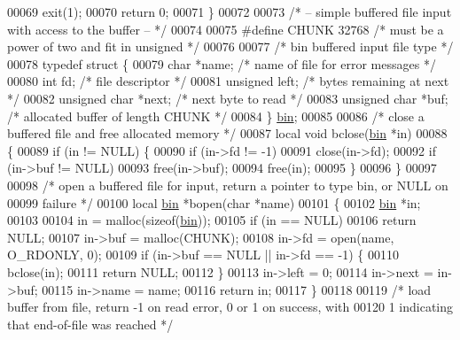 \begin{DoxyCode}
{00069     exit(1);
00070     \textcolor{keywordflow}{return} 0;
00071 \}
00072 
00073 \textcolor{comment}{/* -- simple buffered file input with access to the buffer -- */}
00074 
00075 \textcolor{preprocessor}{#define CHUNK 32768         }\textcolor{comment}{/* must be a power of two and fit in unsigned */}\textcolor{preprocessor}{}
00076 
00077 \textcolor{comment}{/* bin buffered input file type */}
00078 \textcolor{keyword}{typedef} \textcolor{keyword}{struct }\{
00079     \textcolor{keywordtype}{char} *name;             \textcolor{comment}{/* name of file for error messages */}
00080     \textcolor{keywordtype}{int} fd;                 \textcolor{comment}{/* file descriptor */}
00081     \textcolor{keywordtype}{unsigned} left;          \textcolor{comment}{/* bytes remaining at next */}
00082     \textcolor{keywordtype}{unsigned} \textcolor{keywordtype}{char} *next;    \textcolor{comment}{/* next byte to read */}
00083     \textcolor{keywordtype}{unsigned} \textcolor{keywordtype}{char} *buf;     \textcolor{comment}{/* allocated buffer of length CHUNK */}
00084 \} \hyperlink{structbin}{bin};
00085 
00086 \textcolor{comment}{/* close a buffered file and free allocated memory */}
00087 local \textcolor{keywordtype}{void} bclose(\hyperlink{structbin}{bin} *in)
00088 \{
00089     \textcolor{keywordflow}{if} (in != NULL) \{
00090         \textcolor{keywordflow}{if} (in->fd != -1)
00091             close(in->fd);
00092         \textcolor{keywordflow}{if} (in->buf != NULL)
00093             free(in->buf);
00094         free(in);
00095     \}
00096 \}
00097 
00098 \textcolor{comment}{/* open a buffered file for input, return a pointer to type bin, or NULL on}
00099 \textcolor{comment}{   failure */}
00100 local \hyperlink{structbin}{bin} *bopen(\textcolor{keywordtype}{char} *name)
00101 \{
00102     \hyperlink{structbin}{bin} *in;
00103 
00104     in = malloc(\textcolor{keyword}{sizeof}(\hyperlink{structbin}{bin}));
00105     \textcolor{keywordflow}{if} (in == NULL)
00106         \textcolor{keywordflow}{return} NULL;
00107     in->buf = malloc(CHUNK);
00108     in->fd = open(name, O\_RDONLY, 0);
00109     \textcolor{keywordflow}{if} (in->buf == NULL || in->fd == -1) \{
00110         bclose(in);
00111         \textcolor{keywordflow}{return} NULL;
00112     \}
00113     in->left = 0;
00114     in->next = in->buf;
00115     in->name = name;
00116     \textcolor{keywordflow}{return} in;
00117 \}
00118 
00119 \textcolor{comment}{/* load buffer from file, return -1 on read error, 0 or 1 on success, with}
00120 \textcolor{comment}{   1 indicating that end-of-file was reached */}
}
\end{DoxyCode}

